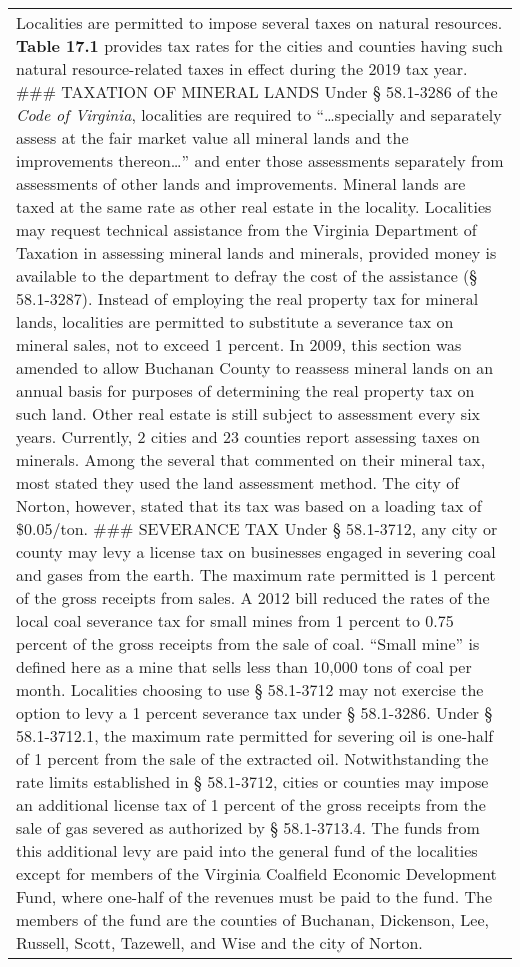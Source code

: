 \documentclass[
]{book}
\begin{document}
\begin{longtable}[]{@{}
  >{\raggedright\arraybackslash}p{}@{}}
\textbar{}
\textbar{} Localities are permitted to impose several taxes on natural resources. \textbf{Table 17.1} provides tax rates for the cities and counties having such natural resource-related taxes in effect during the 2019 tax year.
\textbar{}
\#\#\# TAXATION OF MINERAL LANDS
\textbar{} Under § 58.1-3286 of the \emph{Code of Virginia}, localities are required to ``\ldots specially and separately assess at the fair market value all mineral lands and the improvements thereon\ldots{}'' and enter those assessments separately from assessments of other lands and improvements. Mineral lands are taxed at the same rate as other real estate in the locality. Localities may request technical assistance from the Virginia Department of Taxation in assessing mineral lands and minerals, provided money is available to the department to defray the cost of the assistance (§ 58.1-3287). Instead of employing the real property tax for mineral lands, localities are permitted to substitute a severance tax on mineral sales, not to exceed 1 percent.
\textbar{}
\textbar{} In 2009, this section was amended to allow Buchanan County to reassess mineral lands on an annual basis for purposes of determining the real property tax on such land. Other real estate is still subject to assessment every six years. Currently, 2 cities and 23 counties report assessing taxes on minerals. Among the several that commented on their mineral tax, most stated they used the land assessment method. The city of Norton, however, stated that its tax was based on a loading tax of \$0.05/ton.
\textbar{}
\#\#\# SEVERANCE TAX
\textbar{} Under § 58.1-3712, any city or county may levy a license tax on businesses engaged in severing coal and gases from the earth. The maximum rate permitted is 1 percent of the gross receipts from sales. A 2012 bill reduced the rates of the local coal severance tax for small mines from 1 percent to 0.75 percent of the gross receipts from the sale of coal. ``Small mine'' is defined here as a mine that sells less than 10,000 tons of coal per month.
\textbar{}
\textbar{} Localities choosing to use § 58.1-3712 may not exercise the option to levy a 1 percent severance tax under § 58.1-3286. Under § 58.1-3712.1, the maximum rate permitted for severing oil is one-half of 1 percent from the sale of the extracted oil. Notwithstanding the rate limits established in § 58.1-3712, cities or counties may impose an additional license tax of 1 percent of the gross receipts from the sale of gas severed as authorized by § 58.1-3713.4. The funds from this additional levy are paid into the general fund of the localities except for members of the Virginia Coalfield Economic Development Fund, where one-half of the revenues must be paid to the fund. The members of the fund are the counties of Buchanan, Dickenson, Lee, Russell, Scott, Tazewell, and Wise and the city of Norton.

\end{longtable}
\end{document}
